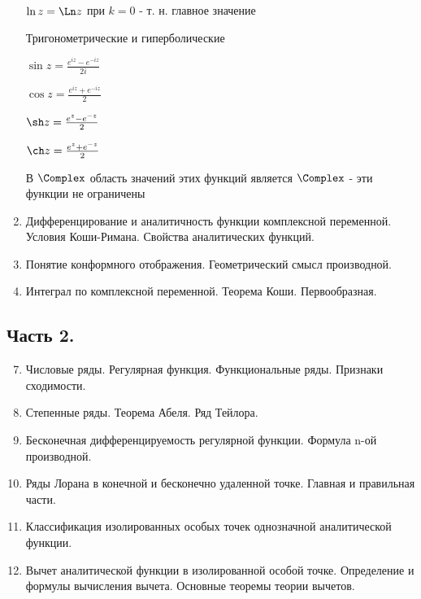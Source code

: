 \begin{enumerate}
    $\ln z = \Ln z$ при $k = 0$ - т. н. главное значение
    
     Тригонометрические и гиперболические

    \begin{multicols}{2}
        \begin{center}
            $\sin z = \frac{e^{iz} - e^{-iz}}{2i}$

            $\cos z = \frac{e^{iz} + e^{-iz}}{2}$

            $\sh z = \frac{e^{z} - e^{-z}}{2}$

            $\ch z = \frac{e^{z} + e^{-z}}{2}$
        \end{center}
    \end{multicols}

    В $\Complex$ область значений этих функций является $\Complex$ - эти функции не ограничены


    \item Дифференцирование и аналитичность функции комплексной переменной. Условия Коши-Римана. Свойства аналитических функций.
    \item Понятие конформного отображения. Геометрический смысл производной.
    \item Интеграл по комплексной переменной. Теорема Коши. Первообразная.
\end{enumerate}

    

\subsection{Часть 2.}

\begin{enumerate}
    \setcounter{enumi}{6}

    \item Числовые ряды. Регулярная функция. Функциональные ряды. Признаки сходимости.
    \item Степенные ряды. Теорема Абеля. Ряд Тейлора.
    \item Бесконечная дифференцируемость регулярной функции. Формула n-ой производной.
    \item Ряды Лорана в конечной и бесконечно удаленной точке. Главная и правильная части.
    \item Классификация изолированных особых точек однозначной аналитической функции.
    \item Вычет аналитической функции в изолированной особой точке. Определение и формулы вычисления вычета. Основные теоремы теории вычетов.
\end{enumerate}